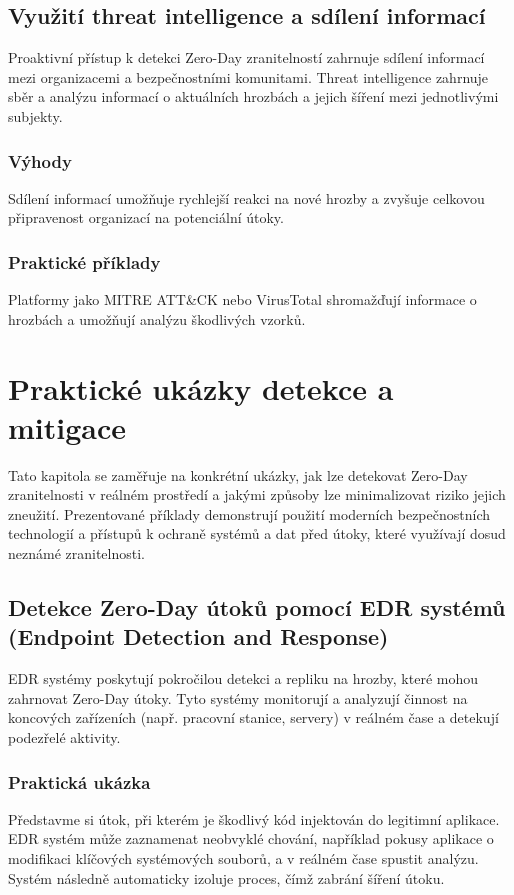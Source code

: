\documentclass[11pt, conference, a4paper]{IEEEtran}
\begin{document}
\subsection{Využití threat intelligence a sdílení informací \cite{Baker}}
Proaktivní přístup k detekci Zero-Day zranitelností zahrnuje sdílení informací mezi organizacemi a bezpečnostními komunitami. Threat intelligence zahrnuje sběr a analýzu informací o aktuálních hrozbách a jejich šíření mezi jednotlivými subjekty.

\subsubsection{Výhody} Sdílení informací umožňuje rychlejší reakci na nové hrozby a zvyšuje celkovou připravenost organizací na potenciální útoky.
\subsubsection{Praktické příklady} Platformy jako MITRE ATT\&CK nebo VirusTotal shromažďují informace o hrozbách a umožňují analýzu škodlivých vzorků.
\section{Praktické ukázky detekce a mitigace}
Tato kapitola se zaměřuje na konkrétní ukázky, jak lze detekovat Zero-Day zranitelnosti v reálném prostředí a jakými způsoby lze minimalizovat riziko jejich zneužití. Prezentované příklady demonstrují použití moderních bezpečnostních technologií a přístupů k ochraně systémů a dat před útoky, které využívají dosud neznámé zranitelnosti.

\subsection{Detekce Zero-Day útoků pomocí EDR systémů (Endpoint Detection and Response) \cite{edr}}
EDR systémy poskytují pokročilou detekci a repliku na hrozby, které mohou zahrnovat Zero-Day útoky. Tyto systémy monitorují a analyzují činnost na koncových zařízeních (např. pracovní stanice, servery) v reálném čase a detekují podezřelé aktivity.

\subsubsection{Praktická ukázka} Představme si útok, při kterém je škodlivý kód injektován do legitimní aplikace. EDR systém může zaznamenat neobvyklé chování, například pokusy aplikace o modifikaci klíčových systémových souborů, a v reálném čase spustit analýzu. Systém následně automaticky izoluje proces, čímž zabrání šíření útoku.
\end{document}
